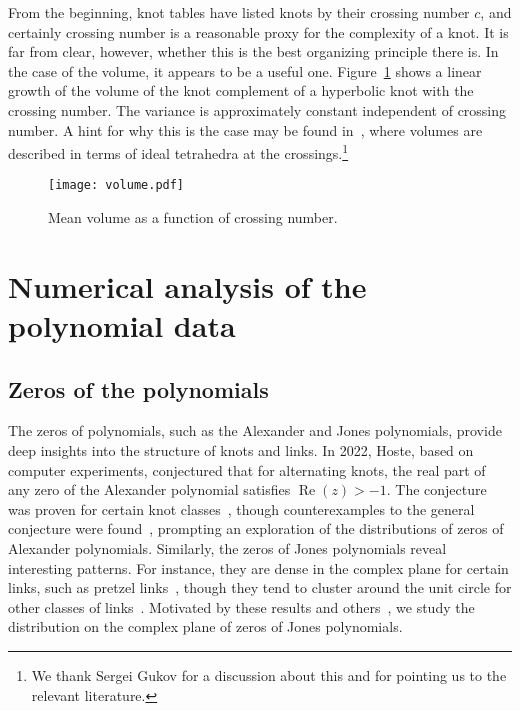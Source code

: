 \documentclass[11pt]{article}
\newcommand{\VJ}[1]{{\color{ForestGreen}{\textbf{VJ:} #1}}}
\begin{document}
From the beginning, knot tables have listed knots by their crossing number $c$, and certainly crossing number is a reasonable proxy for the complexity of a knot.
It is far from clear, however, whether this is the best organizing principle there is.
In the case of the volume, it appears to be a useful one.
Figure~\ref{fig:volumes} shows a linear growth of the volume of the knot complement of a hyperbolic knot with the crossing number.
The variance is approximately constant independent of crossing number.
A hint for why this is the case may be found in~\cite{yokota2000volume}, where volumes are described in terms of ideal tetrahedra at the crossings.\footnote{
We thank Sergei Gukov for a discussion about this and for pointing us to the relevant literature.}

\begin{figure}[h]
\centering
\texttt{[image: volume.pdf]}
\caption{\textsf{Mean volume as a function of crossing number.}} 
\label{fig:volumes}
\end{figure}

\section{Numerical analysis of the polynomial data}\label{sec:analysis}

\subsection{Zeros of the polynomials}
The zeros of polynomials, such as the Alexander and Jones polynomials, provide deep insights into the structure of knots and links.
In 2022, Hoste, based on computer experiments, conjectured that for alternating knots, the real part of any zero of the Alexander polynomial satisfies $\operatorname{Re}(z) > -1$.
The conjecture was proven for certain knot classes~\cite{Ishikawa2019, Stoimenow2011,alsukaiti2024alexander,HM2013}, though counterexamples to the general conjecture were found~\cite{HIRASAWA201948}, prompting an exploration of the distributions of zeros of Alexander polynomials.
Similarly, the zeros of Jones polynomials reveal interesting patterns.
For instance, they are dense in the complex plane for certain links, such as pretzel links~\cite{Jin2010}, though they tend to cluster around the unit circle for other classes of links~\cite{AI2005,XF2010}.
Motivated by these results and others~\cite{Andersen:2004}, we study the distribution on the complex plane of zeros of Jones polynomials.
\end{document}
